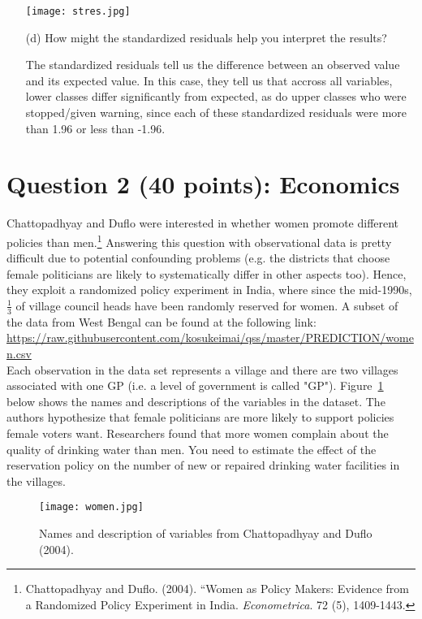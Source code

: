 \documentclass[12pt,letterpaper]{article}
\begin{document}
\begin{enumerate}
\begin{table}[h]
\begin{tabular}{l | c c c }
		\end{tabular}
	\end{table}
	
	\vspace{1cm}
	\texttt{[image: stres.jpg]}
	\vspace{5cm}
	\item [(d)] How might the standardized residuals help you interpret the results?  
	
	\noindent The standardized residuals tell us the difference between an observed value and its expected value. In this case, they tell us that accross all variables, lower classes differ significantly from expected, as do upper classes who were stopped/given warning, since each of these standardized residuals were more than 1.96 or less than -1.96. 
\end{enumerate}
\newpage

\section*{Question 2 (40 points): Economics}
Chattopadhyay and Duflo were interested in whether women promote different policies than men.\footnote{Chattopadhyay and Duflo. (2004). ``Women as Policy Makers: Evidence from a Randomized Policy Experiment in India. \textit{Econometrica}. 72 (5), 1409-1443.} Answering this question with observational data is pretty difficult due to potential confounding problems (e.g. the districts that choose female politicians are likely to systematically differ in other aspects too). Hence, they exploit a randomized policy experiment in India, where since the mid-1990s, $\frac{1}{3}$ of village council heads have been randomly reserved for women. A subset of the data from West Bengal can be found at the following link: \url{https://raw.githubusercontent.com/kosukeimai/qss/master/PREDICTION/women.csv}\\

\noindent Each observation in the data set represents a village and there are two villages associated with one GP (i.e. a level of government is called "GP"). Figure~\ref{fig:women_desc} below shows the names and descriptions of the variables in the dataset. The authors hypothesize that female politicians are more likely to support policies female voters want. Researchers found that more women complain about the quality of drinking water than men. You need to estimate the effect of the reservation policy on the number of new or repaired drinking water facilities in the villages.
\vspace{.5cm}
\begin{figure}[h!]
	\caption{\footnotesize{Names and description of variables from Chattopadhyay and Duflo (2004).}}
	\vspace{.5cm}
	\centering
	\label{fig:women_desc}	\texttt{[image: women.jpg]}
\end{figure}		
\end{document}
